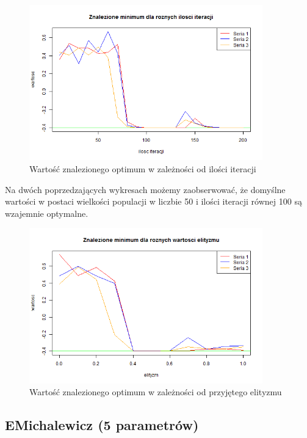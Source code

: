 \documentclass[11pt, a4paper]{article}
\newcommand{\fbi}{\leavevmode{\parindent=1em\indent}}
\begin{document}
\begin{figure}[H]
	\begin{center}
		\includegraphics[width=0.9\textwidth]{./assets/CosMix45.png} %
		\caption{Wartość znalezionego optimum w zależności od ilości iteracji}
		\label{fig:cosmix45}
	\end{center}
\end{figure}

\fbi
Na dwóch poprzedzających wykresach możemy zaobserwować, że domyślne wartości w postaci wielkości populacji w liczbie 50 i ilości iteracji równej 100 są wzajemnie optymalne.

\begin{figure}[H]
	\begin{center}
		\includegraphics[width=0.9\textwidth]{./assets/CosMix46.png} %
		\caption{Wartość znalezionego optimum w zależności od przyjętego elityzmu}
		\label{fig:cosmix46}
	\end{center}
\end{figure}

\subsection{EMichalewicz (5 parametrów)}
\end{document}
